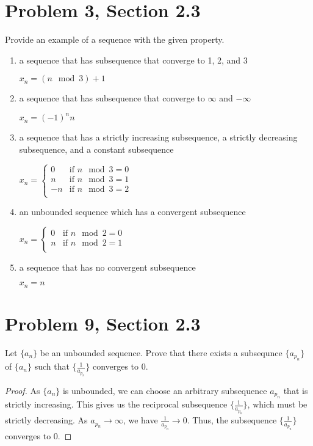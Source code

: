 \documentclass[12pt]{article}
\begin{document}
  \section*{Problem 3, Section 2.3}
  Provide an example of a sequence with the given property.
  \begin{enumerate}[label=(\alph*)]
    \item a sequence that has subsequence that converge to 1, 2, and 3
    
    $x_n = (n\mod3) + 1$
    \item a sequence that has subsequence that converge to $\infty$ and $-\infty$
    
    $x_n = (-1)^n n$
    \item a sequence that has a strictly increasing subsequence, a strictly decreasing subsequence, and a constant subsequence
    
    $x_n = \begin{cases} 
      0 & \text{if } n \mod 3 = 0 \\
      n & \text{if } n \mod 3 = 1 \\
      -n & \text{if } n \mod 3 = 2 \\
    \end{cases}$
    \item an unbounded sequence which has a convergent subsequence
    
    $x_n = \begin{cases} 
      0 & \text{if } n \mod 2 = 0 \\
      n & \text{if } n \mod 2 = 1 \\
    \end{cases}$
    \item a sequence that has no convergent subsequence
    
    $x_n = n$
  \end{enumerate}

  \newpage


  \section*{Problem 9, Section 2.3}
  Let $\{a_n\}$ be an unbounded sequence. Prove that there exists a subsequnce $\{a_{p_n}\}$ of $\{a_n\}$ such that ${\{\frac{1}{a_{p_n}}\}}$ converges to $0$.
  \begin{proof}
    As $\{a_n\}$ is unbounded, we can choose an arbitrary subsequence ${a_{p_n}}$ that is strictly increasing. This gives us the reciprocal subsequence $\{\frac{1}{a_{p_n}}\}$, which must be strictly decreasing. As $a_{p_n} \to \infty$, we have $\frac{1}{a_{p_n}} \to 0$. Thus, the subsequence $\{\frac{1}{a_{p_n}}\}$ converges to $0$.
  \end{proof}
\end{document}
